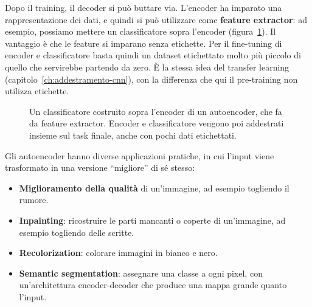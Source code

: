 Dopo il training, il decoder si può buttare via. L'encoder ha imparato una rappresentazione dei dati, e quindi si può utilizzare come \textbf{feature extractor}: ad esempio, possiamo mettere un classificatore sopra l'encoder (figura~\ref{fig:autoencoder-classificatore}). Il vantaggio è che le feature si imparano senza etichette. Per il fine-tuning di encoder e classificatore basta quindi un dataset etichettato molto più piccolo di quello che servirebbe partendo da zero. È la stessa idea del transfer learning (capitolo~\ref{ch:addestramento-cnn}), con la differenza che qui il pre-training non utilizza etichette.

\begin{figure}[htbp]
\centering
{}
\caption{Un classificatore costruito sopra l'encoder di un autoencoder, che fa da feature extractor. Encoder e classificatore vengono poi addestrati insieme sul task finale, anche con pochi dati etichettati.}
\label{fig:autoencoder-classificatore}
\end{figure}

Gli autoencoder hanno diverse applicazioni pratiche, in cui l'input viene trasformato in una versione ``migliore'' di sé stesso:
\begin{itemize}
    \item \textbf{Miglioramento della qualità} di un'immagine, ad esempio togliendo il rumore.
    \item \textbf{Inpainting}: ricostruire le parti mancanti o coperte di un'immagine, ad esempio togliendo delle scritte.
    \item \textbf{Recolorization}: colorare immagini in bianco e nero.
    \item \textbf{Semantic segmentation}: assegnare una classe a ogni pixel, con un'architettura encoder-decoder che produce una mappa grande quanto l'input.
\end{itemize}

